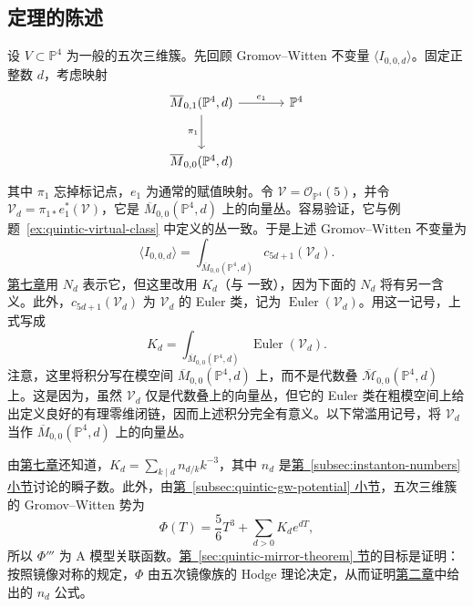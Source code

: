 \subsection{定理的陈述}\label{subsec:quintic-mirror-theorem-statement}
设 $V\subset\mathbb P^4$ 为一般的五次三维簇。先回顾 Gromov--Witten 不变量 $\langle I_{0,0,d}\rangle$。固定正整数 $d$，考虑映射
\[
\begin{tikzcd}[column sep=large,row sep=large]
\overline M_{0,1}(\mathbb P^4,d)\arrow[r,"e_1"]\arrow[d,"\pi_1"']&\mathbb P^4\\
\overline M_{0,0}(\mathbb P^4,d)&
\end{tikzcd}
\]
其中 $\pi_1$ 忘掉标记点，$e_1$ 为通常的赋值映射。令 $\mathcal V=\mathcal O_{\mathbb P^4}(5)$，并令 $\mathcal V_d=\pi_{1*}e_1^*(\mathcal V)$，它是 $\overline M_{0,0}(\mathbb P^4,d)$ 上的向量丛。容易验证，它与例题~\ref{ex:quintic-virtual-class} 中定义的丛一致。于是上述 Gromov--Witten 不变量为
\[
\langle I_{0,0,d}\rangle=\int_{\overline M_{0,0}(\mathbb P^4,d)}c_{5d+1}(\mathcal V_d).
\]
\hyperref[chap:gromov-witten]{第七章}用 $N_d$ 表示它，但这里改用 $K_d$（与  一致），因为下面的 $N_d$ 将有另一含义。此外，$c_{5d+1}(\mathcal V_d)$ 为 $\mathcal V_d$ 的 Euler 类，记为 $\operatorname{Euler}(\mathcal V_d)$。用这一记号，上式写成
\[
K_d=\int_{\overline M_{0,0}(\mathbb P^4,d)}\operatorname{Euler}(\mathcal V_d).
\]
注意，这里将积分写在模空间 $\overline M_{0,0}(\mathbb P^4,d)$ 上，而不是代数叠 $\overline{\mathcal M}_{0,0}(\mathbb P^4,d)$ 上。这是因为，虽然 $\mathcal V_d$ 仅是代数叠上的向量丛，但它的 Euler 类在粗模空间上给出定义良好的有理零维闭链，因而上述积分完全有意义。以下常滥用记号，将 $\mathcal V_d$ 当作 $\overline M_{0,0}(\mathbb P^4,d)$ 上的向量丛。

由\hyperref[chap:gromov-witten]{第七章}还知道，$K_d=\sum_{k\mid d}n_{d/k}k^{-3}$，其中 $n_d$ 是\hyperref[subsec:instanton-numbers]{第~\ref*{subsec:instanton-numbers} 小节}讨论的瞬子数。此外，由\hyperref[subsec:quintic-gw-potential]{第~\ref*{subsec:quintic-gw-potential} 小节}，五次三维簇的 Gromov--Witten 势为
\[
\Phi(T)=\frac56T^3+\sum_{d>0}K_de^{dT},
\]
所以 $\Phi'''$ 为 A 模型关联函数。\hyperref[sec:quintic-mirror-theorem]{第~\ref*{sec:quintic-mirror-theorem} 节}的目标是证明：按照镜像对称的规定，$\Phi$ 由五次镜像族的 Hodge 理论决定，从而证明\hyperref[chap:quintic]{第二章}中给出的 $n_d$ 公式。

